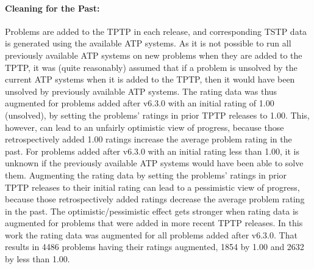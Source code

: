 \documentclass[runningheads]{llncs}
\begin{document}
\paragraph{Cleaning for the Past:}
Problems are added to the TPTP in each release, and corresponding TSTP data is generated using 
the available ATP systems.
As it is not possible to run all previously available ATP systems on new problems when they 
are added to the TPTP, it was (quite reasonably) assumed that if a problem is unsolved by the 
current ATP systems when it is added to the TPTP, then it would have been unsolved by 
previously available ATP systems.
The rating data was thus augmented for problems added after v6.3.0 with an initial rating 
of 1.00 (unsolved), by setting the problems' ratings in prior TPTP releases to 1.00.
This, however, can lead to an unfairly optimistic view of progress, because those retrospectively 
added 1.00 ratings increase the average problem rating in the past.
For problems added after v6.3.0 with an initial rating less than 1.00, it is unknown if the
previously available ATP systems would have been able to solve them.
Augmenting the rating data by setting the problems' ratings in prior TPTP releases to their 
initial rating can lead to a pessimistic view of progress, because those retrospectively
added ratings decrease the average problem rating in the past.
The optimistic/pessimistic effect gets stronger when rating data is augmented for problems that
were added in more recent TPTP releases.
In this work the rating data was augmented for all problems added after v6.3.0.
That results in 4486 problems having their ratings augmented, 1854 by 1.00 and 2632 by less than 
1.00.
\end{document}

